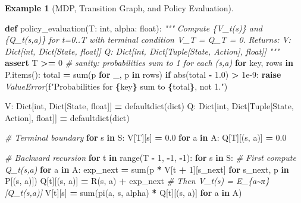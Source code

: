 \documentclass[
]{book}
\newenvironment{Shaded}{\begin{snugshade}}{\end{snugshade}}
\newcommand{\BuiltInTok}[1]{#1}
\newcommand{\CommentTok}[1]{\textcolor[rgb]{0.56,0.35,0.01}{\textit{#1}}}
\newcommand{\ControlFlowTok}[1]{\textcolor[rgb]{0.13,0.29,0.53}{\textbf{#1}}}
\newcommand{\DecValTok}[1]{\textcolor[rgb]{0.00,0.00,0.81}{#1}}
\newcommand{\FloatTok}[1]{\textcolor[rgb]{0.00,0.00,0.81}{#1}}
\newcommand{\KeywordTok}[1]{\textcolor[rgb]{0.13,0.29,0.53}{\textbf{#1}}}
\newcommand{\NormalTok}[1]{#1}
\newcommand{\OperatorTok}[1]{\textcolor[rgb]{0.81,0.36,0.00}{\textbf{#1}}}
\newcommand{\PreprocessorTok}[1]{\textcolor[rgb]{0.56,0.35,0.01}{\textit{#1}}}
\newcommand{\SpecialCharTok}[1]{\textcolor[rgb]{0.81,0.36,0.00}{\textbf{#1}}}
\newcommand{\SpecialStringTok}[1]{\textcolor[rgb]{0.31,0.60,0.02}{#1}}
\theoremstyle{definition}
\theoremstyle{definition}
\newtheorem{example}{Example}[chapter]
\theoremstyle{definition}
\theoremstyle{definition}
\theoremstyle{remark}
\begin{document}
\begin{example}[MDP, Transition Graph, and Policy Evaluation]
\begin{Shaded}
\begin{Highlighting}[]
\KeywordTok{def}\NormalTok{ policy\_evaluation(T: }\BuiltInTok{int}\NormalTok{, alpha: }\BuiltInTok{float}\NormalTok{):}
    \CommentTok{"""}
\CommentTok{    Compute \{V\_t(s)\} and \{Q\_t(s,a)\} for t=0..T with terminal condition V\_T = Q\_T = 0.}
\CommentTok{    Returns:}
\CommentTok{        V: Dict[int, Dict[State, float]]}
\CommentTok{        Q: Dict[int, Dict[Tuple[State, Action], float]]}
\CommentTok{    """}
    \ControlFlowTok{assert}\NormalTok{ T }\OperatorTok{\textgreater{}=} \DecValTok{0}
    \CommentTok{\# sanity: probabilities sum to 1 for each (s,a)}
    \ControlFlowTok{for}\NormalTok{ key, rows }\KeywordTok{in}\NormalTok{ P.items():}
\NormalTok{        total }\OperatorTok{=} \BuiltInTok{sum}\NormalTok{(p }\ControlFlowTok{for}\NormalTok{ \_, p }\KeywordTok{in}\NormalTok{ rows)}
        \ControlFlowTok{if} \BuiltInTok{abs}\NormalTok{(total }\OperatorTok{{-}} \FloatTok{1.0}\NormalTok{) }\OperatorTok{\textgreater{}} \FloatTok{1e{-}9}\NormalTok{:}
            \ControlFlowTok{raise} \PreprocessorTok{ValueError}\NormalTok{(}\SpecialStringTok{f"Probabilities for }\SpecialCharTok{\{}\NormalTok{key}\SpecialCharTok{\}}\SpecialStringTok{ sum to }\SpecialCharTok{\{}\NormalTok{total}\SpecialCharTok{\}}\SpecialStringTok{, not 1."}\NormalTok{)}

\NormalTok{    V: Dict[}\BuiltInTok{int}\NormalTok{, Dict[State, }\BuiltInTok{float}\NormalTok{]] }\OperatorTok{=}\NormalTok{ defaultdict(}\BuiltInTok{dict}\NormalTok{)}
\NormalTok{    Q: Dict[}\BuiltInTok{int}\NormalTok{, Dict[Tuple[State, Action], }\BuiltInTok{float}\NormalTok{]] }\OperatorTok{=}\NormalTok{ defaultdict(}\BuiltInTok{dict}\NormalTok{)}

    \CommentTok{\# Terminal boundary}
    \ControlFlowTok{for}\NormalTok{ s }\KeywordTok{in}\NormalTok{ S:}
\NormalTok{        V[T][s] }\OperatorTok{=} \FloatTok{0.0}
        \ControlFlowTok{for}\NormalTok{ a }\KeywordTok{in}\NormalTok{ A:}
\NormalTok{            Q[T][(s, a)] }\OperatorTok{=} \FloatTok{0.0}

    \CommentTok{\# Backward recursion}
    \ControlFlowTok{for}\NormalTok{ t }\KeywordTok{in} \BuiltInTok{range}\NormalTok{(T }\OperatorTok{{-}} \DecValTok{1}\NormalTok{, }\OperatorTok{{-}}\DecValTok{1}\NormalTok{, }\OperatorTok{{-}}\DecValTok{1}\NormalTok{):}
        \ControlFlowTok{for}\NormalTok{ s }\KeywordTok{in}\NormalTok{ S:}
            \CommentTok{\# First compute Q\_t(s,a)}
            \ControlFlowTok{for}\NormalTok{ a }\KeywordTok{in}\NormalTok{ A:}
\NormalTok{                exp\_next }\OperatorTok{=} \BuiltInTok{sum}\NormalTok{(p }\OperatorTok{*}\NormalTok{ V[t }\OperatorTok{+} \DecValTok{1}\NormalTok{][s\_next] }\ControlFlowTok{for}\NormalTok{ s\_next, p }\KeywordTok{in}\NormalTok{ P[(s, a)])}
\NormalTok{                Q[t][(s, a)] }\OperatorTok{=}\NormalTok{ R(s, a) }\OperatorTok{+}\NormalTok{ exp\_next}
            \CommentTok{\# Then V\_t(s) = E\_\{a\textasciitilde{}π\}[Q\_t(s,a)]}
\NormalTok{            V[t][s] }\OperatorTok{=} \BuiltInTok{sum}\NormalTok{(pi(a, s, alpha) }\OperatorTok{*}\NormalTok{ Q[t][(s, a)] }\ControlFlowTok{for}\NormalTok{ a }\KeywordTok{in}\NormalTok{ A)}


\end{Highlighting}
\end{Shaded}
\end{example}
\end{document}
